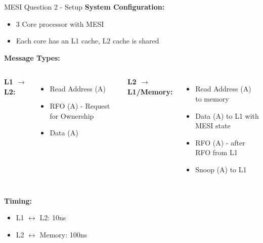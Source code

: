 \documentclass[aspectratio=169,12pt]{beamer}
\begin{document}
\begin{frame}{MESI Question 2 - Setup}
\textbf{System Configuration:}
\begin{itemize}
\item 3 Core processor with MESI
\item Each core has an L1 cache, L2 cache is shared
\end{itemize}

\textbf{Message Types:}
\begin{columns}
\textbf{L1 $\rightarrow$ L2:}
\begin{itemize}
\item Read Address (A)
\item RFO (A) - Request for Ownership
\item Data (A)
\end{itemize}

\textbf{L2 $\rightarrow$ L1/Memory:}
\begin{itemize}
\item Read Address (A) to memory
\item Data (A) to L1 with MESI state
\item RFO (A) - after RFO from L1
\item Snoop (A) to L1
\end{itemize}
\end{columns}

\vspace{1em}
\textbf{Timing:}
\begin{itemize}
\item L1 $\leftrightarrow$ L2: 10ns
\item L2 $\leftrightarrow$ Memory: 100ns
\end{itemize}
\end{frame}
\end{document}

